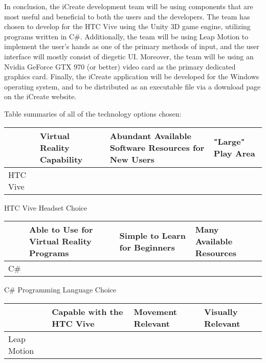 \documentclass[letterpaper,10pt,onecolumn,compsoc]{IEEEtran}
\begin{document}
In conclusion, the iCreate development team will be using components that are most useful and beneficial to both the users and the developers. The team has chosen to develop for the HTC Vive using the Unity 3D game engine, utilizing programs written in C\#. Additionally, the team will be using Leap Motion to implement the user's hands as one of the primary methods of input, and the user interface will mostly consist of diegetic UI. Moreover, the team will be using an Nvidia GeForce GTX 970 (or better) video card as the primary dedicated graphics card. Finally, the iCreate application will be developed for the Windows operating system, and to be distributed as an executable file via a download page on the iCreate website.

\noindent
Table summaries of all of the technology options chosen:

\begin{center}
\begin{tabular}{ | P{3.125cm} | P{4cm} | P{4.5cm} | P{4.125cm} |} 
 	\hline
 	 & Virtual Reality Capability & Abundant Available Software Resources for New Users & "Large" Play Area \\ 
 	\hline 		
 	HTC Vive & \checkmark & \checkmark & \checkmark \\ 
 	\hline
\end{tabular}
\end{center}

\begin{center}
HTC Vive Headset Choice
\end{center}

\begin{center}
\begin{tabular}{ | P{4.5cm} | P{3.5cm} | P{2.75cm} | P{5cm} | } 
 	\hline
 	 & Able to Use for Virtual Reality Programs & Simple to Learn for Beginners & Many Available Resources \\ 
 	\hline 		
 	C\# & \checkmark & \checkmark & \checkmark \\ 
 	\hline
\end{tabular}
\end{center}

\begin{center}
C\# Programming Language Choice
\end{center}

\begin{center}
\begin{tabular}{ | P{4.125cm} | P{4.5cm} | P{3.5cm} | P{3.625cm} | } 
 	\hline
 	 & Capable with the HTC Vive & Movement Relevant & Visually Relevant \\ 
 	\hline 		
 	Leap Motion & \checkmark & \checkmark & \\ 
 	\hline
\end{tabular}
\end{center}
\end{document}
